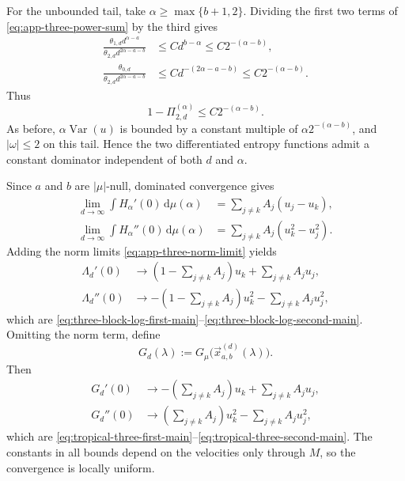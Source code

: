 \documentclass[aps,pra,11pt,onecolumn,nofootinbib,tightenlines]{revtex4-2}
\theoremstyle{definition}
\begin{document}
For the unbounded tail, take $\alpha\geq\max\{b+1,2\}$.  Dividing the first two terms of \eqref{eq:app-three-power-sum} by the third gives
\begin{align}
 \frac{\theta_{1,d}d^{\alpha-a}}
      {\theta_{2,d}d^{2\alpha-a-b}}
 &\leq C d^{b-\alpha}
 \leq C2^{-(\alpha-b)},
 \label{eq:app-three-tail-ratio-one}\\
 \frac{\theta_{0,d}}
      {\theta_{2,d}d^{2\alpha-a-b}}
 &\leq C d^{-(2\alpha-a-b)}
 \leq C2^{-(\alpha-b)}.
 \label{eq:app-three-tail-ratio-zero}
\end{align}
Thus
\begin{equation}
 1-\Pi_{2,d}^{(\alpha)}
 \leq C2^{-(\alpha-b)}.
 \label{eq:app-three-tail-weight}
\end{equation}
As before, $\alpha\operatorname{Var}(u)$ is bounded by a constant multiple of $\alpha2^{-(\alpha-b)}$, and $|\omega|\leq2$ on this tail.  Hence the two differentiated entropy functions admit a constant dominator independent of both $d$ and $\alpha$.

Since $a$ and $b$ are $|\mu|$-null, dominated convergence gives
\begin{align}
 \lim_{d\to\infty}\int H_\alpha'(0)\,\mathrm d\mu(\alpha)
 &=\sum_{j\neq k}A_j(u_j-u_k),
 \label{eq:app-three-integrated-first}\\
 \lim_{d\to\infty}\int H_\alpha''(0)\,\mathrm d\mu(\alpha)
 &=\sum_{j\neq k}A_j(u_k^2-u_j^2).
 \label{eq:app-three-integrated-second}
\end{align}
Adding the norm limits \eqref{eq:app-three-norm-limit} yields
\begin{align}
 \Lambda_d'(0)
 &\longrightarrow
 \left(1-\sum_{j\neq k}A_j\right)u_k
 +\sum_{j\neq k}A_ju_j,
 \label{eq:app-three-final-first}\\
 \Lambda_d''(0)
 &\longrightarrow
 -\left(1-\sum_{j\neq k}A_j\right)u_k^2
 -\sum_{j\neq k}A_ju_j^2,
 \label{eq:app-three-final-second}
\end{align}
which are \eqref{eq:three-block-log-first-main}--\eqref{eq:three-block-log-second-main}.  Omitting the norm term, define
\begin{equation}
G_d(\lambda):=G_\mu\bigl(\vec x_{a,b}^{(d)}(\lambda)\bigr).
\label{eq:app-three-G-d-definition}
\end{equation}
Then
\begin{align}
 G_d'(0)&\longrightarrow
 -\left(\sum_{j\neq k}A_j\right)u_k
 +\sum_{j\neq k}A_ju_j,
 \label{eq:app-three-tropical-first}\\
 G_d''(0)&\longrightarrow
 \left(\sum_{j\neq k}A_j\right)u_k^2
 -\sum_{j\neq k}A_ju_j^2,
 \label{eq:app-three-tropical-second}
\end{align}
which are \eqref{eq:tropical-three-first-main}--\eqref{eq:tropical-three-second-main}.  The constants in all bounds depend on the velocities only through $M$, so the convergence is locally uniform.
\end{document}
